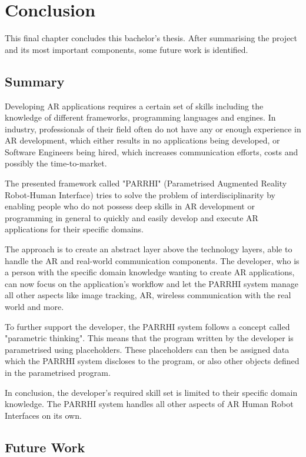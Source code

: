 \chapter{Conclusion}\label{Chap:Conclusion}

This final chapter concludes this bachelor’s thesis. After summarising the project and its most important components, some future work is identified. 

\section{Summary}

Developing AR applications requires a certain set of skills including the knowledge of different frameworks, programming languages and engines. In industry, professionals of their field often do not have any or enough experience in AR development, which either results in no applications being developed, or Software Engineers being hired, which increases communication efforts, costs and possibly the time-to-market.

The presented framework called "PARRHI" (Parametrised Augmented Reality Robot-Human Interface) tries to solve the problem of interdisciplinarity by enabling people who do not possess deep skills in AR development or programming in general to quickly and easily develop and execute AR applications for their specific domains.

The approach is to create an abstract layer above the technology layers, able to handle the AR and real-world communication components. The developer, who is a person with the specific domain knowledge wanting to create AR applications, can now focus on the application’s workflow and let the PARRHI system manage all other aspects like image tracking, AR, wireless communication with the real world and more.

To further support the developer, the PARRHI system follows a concept called "parametric thinking". This means that the program written by the developer is parametrised using placeholders. These placeholders can then be assigned data which the PARRHI system discloses to the program, or also other objects defined in the parametrised program. 

In conclusion, the developer’s required skill set is limited to their specific domain knowledge. The PARRHI system handles all other aspects of AR Human Robot Interfaces on its own.

\section{Future Work}\label{Section:FutureWork}

